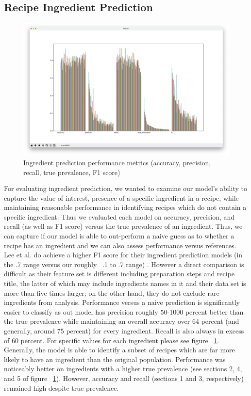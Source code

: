 \documentclass[sigconf]{acmart}
\begin{document}
\subsection{Recipe Ingredient Prediction}
\begin{figure}[h]
    \centering
    \includegraphics[width=\linewidth]{ingredient_pred_final.png}
    \caption{Ingredient prediction performance metrics (accuracy, precision, recall, true prevalence, F1 score)}
    \label{fig:ingred_pred_results}
\end{figure}
For evaluating ingredient prediction, we wanted to examine our model's ability to capture the value of interest, presence of a specific ingredient in a recipe, while maintaining reasonable performance in identifying recipes which do not contain a specific ingredient. Thus we evaluated each model on accuracy, precision, and recall (as well as F1 score) versus the true prevalence of an ingredient. Thus, we can capture if our model is able to out-perform a naive guess as to whether a recipe has an ingredient and we can also assess performance versus references. Lee et al. do achieve a higher F1 score for their ingredient prediction models (in the .7 range versus our roughly ~.1 to .7 range) \cite{NLPRecipeGPT}. However a direct comparison is difficult as their feature set is different including preparation steps and recipe title, the latter of which may include ingredients names in it and their data set is more than five times larger; on the other hand, they do not exclude rare ingredients from analysis. Performance versus a naive prediction is significantly easier to classify as out model has precision roughly 50-1000 percent better than the true prevalence while maintaining an overall accuracy over 64 percent (and generally, around 75 percent) for every ingredient. Recall is also always in excess of 60 percent. For specific values for each ingredient please see figure ~\ref{fig:ingred_pred_results}. Generally, the model is able to identify a subset of recipes which are far more likely to have an ingredient than the original population. Performance was noticeably better on ingredients with a higher true prevalence (see sections 2, 4, and 5 of figure ~\ref{fig:ingred_pred_results}). However, accuracy and recall (sections 1 and 3, respectively) remained high despite true prevalence.
\end{document}
